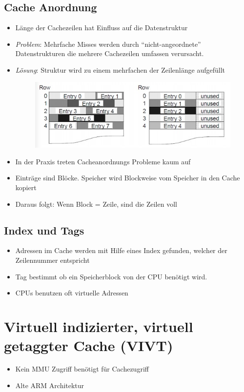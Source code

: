 \documentclass[a4paper]{scrreprt}
\begin{document}
\subsection{Cache Anordnung}
\begin{itemize}
\item Länge der Cachezeilen hat Einfluss auf die Datenstruktur
\item \textit{Problem}: Mehrfache Misses werden durch "`nicht-angeordnete"' Datenstrukturen die mehrere Cachezeilen umfassen verursacht.
\item \textit{Lösung}:  Struktur wird zu einem mehrfachen der Zeilenlänge aufgefüllt

\begin{figure}[ht]
\centering
\includegraphics[scale=0.4]{graphics/cachealignment.png}
\end{figure}

\item In der Praxis treten Cacheanordnungs Probleme kaum auf
\item Einträge sind Blöcke. Speicher wird Blockweise vom Speicher in den Cache kopiert
\item Daraus folgt: Wenn Block = Zeile, sind die Zeilen voll
\end{itemize}

\subsection{Index und Tags}
\begin{itemize}
\item Adressen im Cache werden mit Hilfe eines Index gefunden, welcher der Zeilennummer entspricht
\item  Tag bestimmt ob ein Speicherblock von der CPU benötigt wird.
\item  CPUs benutzen oft virtuelle Adressen
\end{itemize}

\section{Virtuell indizierter, virtuell getaggter Cache (VIVT)}
\begin{itemize}
\item Kein MMU Zugriff benötigt für Cachezugriff
\item Alte ARM Architektur
\end{itemize}
\end{document}
